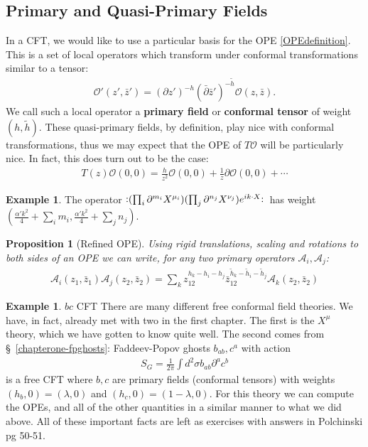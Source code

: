 \documentclass{report}
\theoremstyle{plain}
\newtheorem{proposition}[theorem]{Proposition}
\theoremstyle{definition}
\newtheorem{example}[theorem]{Example}
\theoremstyle{remark}
\newcommand{\FR}[2]{\frac{#1}{#2}}
\newcommand{\ms}{\mathscr}
\newcommand{\lam}{\lambda}
\newcommand{\sg}{\sigma}
\newcommand{\di}{\partial}
\newcommand{\NO}[1]{\vcentcolon\mathrel{#1}\vcentcolon\,}
\begin{document}
\subsection{Primary and Quasi-Primary Fields}
In a CFT, we would like to use a particular basis for the OPE
\eqref{OPEdefinition}. This is a set of local operators which transform
under conformal transformations similar to a tensor:
\begin{align}
    \ms O'(z',\bar z') = (\di z')^{-h}(\bar\di \bar z')^{-\tilde h} \ms
    O(z,\bar z).
    \label{primaryfielddefinition}
\end{align}
We call such a local operator a \textbf{primary field} or \textbf{conformal
tensor} of weight $(h,\tilde h)$. These quasi-primary fields, by
definition, play nice with conformal transformations, thus we may expect
that the OPE of $T\ms O$ will be particularly nice. In fact, this does turn
out to be the case:
\begin{align}
T(z)\ms O(0,0) = \FR{h}{z^2}\ms O(0,0) + \FR{1}{z}\di\ms O(0,0)+\cdots
\end{align}

\begin{example} The operator $\NO{(\prod_i\di^{m_i}X^{\mu_i})
(\prod_j\di^{n_j}X^{\nu_j})e^{ik\cdot X}}$ has weight $\left(
\FR{\alpha'k^2}{4} + \sum_i m_i, \FR{\alpha'k^2}{4} + \sum_j n_j \right)$.
\end{example}

\begin{proposition}[Refined OPE] Using rigid translations, scaling and
rotations to both sides of an OPE we can write, for any two primary
operators $\ms A_i, \ms A_j$:
\begin{align}
    \ms A_i(z_1,\bar z_1)\ms A_j(z_2,\bar z_2) = \sum_k
    z_{12}^{h_k-h_i-h_j}\bar z_{12}^{\tilde h_k-\tilde h_i-\tilde h_j}
    \ms A_k(z_2,\bar z_2)
    \label{refinedOPE}
\end{align}
\end{proposition}

\begin{example}{$bc$ CFT}
There are many different free conformal field theories. We have, in fact,
already met with two in the first chapter. The first is the $X^\mu$ theory,
which we have gotten to know quite well. The second comes from
\S~\!\ref{chapterone-fpghosts}: Faddeev-Popov ghosts $b_{ab},c^a$ with
action \begin{align} S_G = \FR{1}{2\pi} \int d^2\sg b_{ab}\di^a c^b
\end{align} is a free CFT where $b,c$ are primary fields (conformal
tensors) with weights $(h_b,0) = (\lam,0)$ and $(h_c,0) = (1-\lam,0)$.
For this theory we can compute the OPEs, and all of the other quantities in
a similar manner to what we did above. All of these important facts are
left as exercises with answers in Polchinski pg 50-51.
\end{example}
\end{document}
